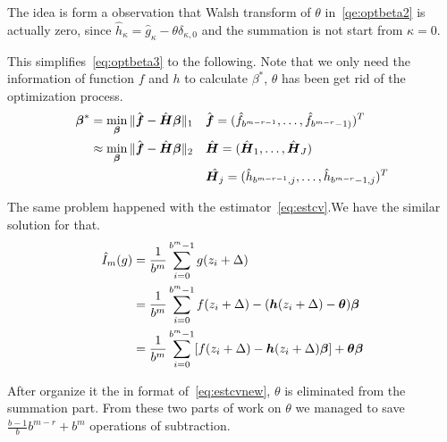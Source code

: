 The idea is form a observation that Walsh transform of $\theta$ in~\eqref{qe:optbeta2} is actually zero, since $\hat{h}_\kappa = \hat{g}_\kappa-\theta\delta_{\kappa,0}$ and the summation is not start from $\kappa=0$.

This simplifies~\eqref{eq:optbeta3} to the following. Note that we only need the information of function $f$ and $h$ to calculate $\beta^*$, $\theta$ has been get rid of the optimization process.
\begin{align}
    \boldsymbol{\beta}^*
    \label{eq:optbetanew}
    &=\min_{\boldsymbol{\beta}}\|\hat{\boldsymbol{f}}-\hat{\boldsymbol{H}}\boldsymbol{\beta}\|_1
    && \hat{\boldsymbol{f}}= (\hat{f}_{b^{m-r-1}},\dots,\hat{f}_{b^{m-r}-1)})^T \\
        \label{eq:optbeta4}
    &\approx\min_{\boldsymbol{\beta}}\|\hat{\boldsymbol{f}}-\hat{\boldsymbol{H}}\boldsymbol{\beta}\|_2
    && \hat{\boldsymbol{H}}= (\hat{\boldsymbol{H}}_1, \dots, \hat{\boldsymbol{H}}_J)\\
    & \notag 
    &&\hat{\boldsymbol{H}_j}=(\hat{h}_{b^{m-r-1},j},\dots, \hat{h}_{b^{m-r}-1,j})^T
\end{align}

The same problem happened with the estimator~\ref{eq:estcv}.We have the similar solution for that.
\begin{align}
    \notag
    \hat{I}_m({g})
    & = \frac{1}{b^m}\sum_{i=0}^{b^m-1}g(z_i+\Delta)\\
    \notag
    & = \frac{1}{b^m}\sum_{i=0}^{b^m-1}f(z_i+\Delta)-(\boldsymbol{h}(z_i+\Delta)-\boldsymbol{\theta})\boldsymbol{\beta}\\
    \label{eq:estcvnew}
    & = \frac{1}{b^m}\sum_{i=0}^{b^m-1}[f(z_i+\Delta)-\boldsymbol{h}(z_i+\Delta)\boldsymbol{\beta}]+\boldsymbol{\theta}\boldsymbol{\beta}
\end{align}

After organize it the in format of~\eqref{eq:estcvnew}, $\theta$ is eliminated from the summation part. From these two parts of work on $\theta$ we managed to save $\frac{b-1}{b}b^{m-r}+b^m$ operations of subtraction.


